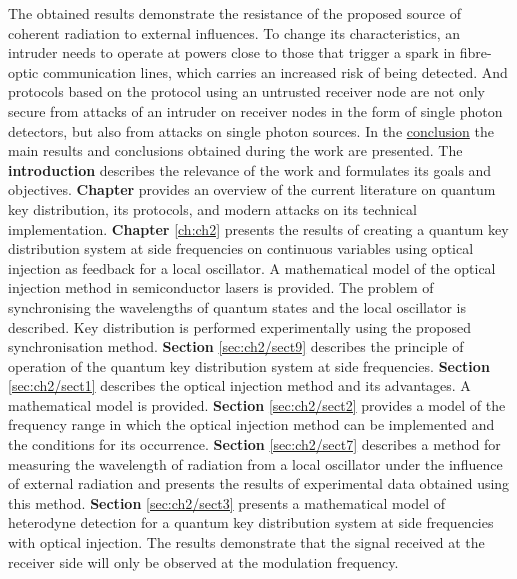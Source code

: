 \newline The obtained results demonstrate the resistance of the proposed source of coherent radiation to external influences. To change its characteristics, an intruder needs to operate at powers close to those that trigger a spark in fibre-optic communication lines, which carries an increased risk of being detected. And protocols based on the protocol using an untrusted receiver node are not only secure from attacks of an intruder on receiver nodes in the form of single photon detectors, but also from attacks on single photon sources.
In the \underline{conclusion} the main results and conclusions obtained during the work are presented.
The \textbf{introduction} describes the relevance of the work and formulates its goals and objectives.
\newline \textbf{Chapter} provides an overview of the current literature on quantum key distribution, its protocols, and modern attacks on its technical implementation.
\newline \textbf{Chapter} \ref{ch:ch2} presents the results of creating a quantum key distribution system at side frequencies on continuous variables using optical injection as feedback for a local oscillator. A mathematical model of the optical injection method in semiconductor lasers is provided. The problem of synchronising the wavelengths of quantum states and the local oscillator is described. Key distribution is performed experimentally using the proposed synchronisation method.
\newline \textbf{Section} \ref{sec:ch2/sect9} describes the principle of operation of the quantum key distribution system at side frequencies.
\newline \textbf{Section} \ref{sec:ch2/sect1} describes the optical injection method and its advantages. A mathematical model is provided.
\newline \textbf{Section} \ref{sec:ch2/sect2} provides a model of the frequency range in which the optical injection method can be implemented and the conditions for its occurrence.
\newline \textbf{Section} \ref{sec:ch2/sect7} describes a method for measuring the wavelength of radiation from a local oscillator under the influence of external radiation and presents the results of experimental data obtained using this method.
\newline \textbf{Section} \ref{sec:ch2/sect3} presents a mathematical model of heterodyne detection for a quantum key distribution system at side frequencies with optical injection. The results demonstrate that the signal received at the receiver side will only be observed at the modulation frequency.
